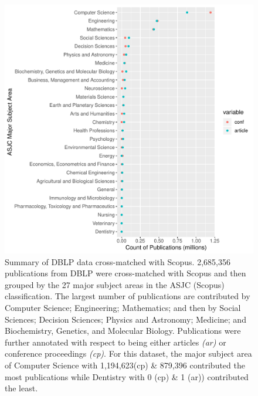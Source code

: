 \begin{figure}[ht]
  \includegraphics[scale=0.6]{ar_cp_ratio.pdf}
\caption{Summary of DBLP data cross-matched with Scopus. 2,685,356 publications from DBLP were cross-matched with Scopus and then grouped by the 27 major subject areas in the ASJC (Scopus) classification. The largest number of publications are contributed by Computer Science; Engineering; Mathematics; and then by Social Sciences; Decision Sciences; Physics and Astronomy; Medicine; and Biochemistry, Genetics, and Molecular Biology. Publications were further annotated with respect to being either articles \emph{(ar)} or conference proceedings \emph{(cp)}. For this dataset, the major subject area of Computer Science with 1,194,623(cp) \& 879,396 contributed the most publications while Dentistry with 0 (cp) \& 1 (ar)) contributed the least.}
\label{fig:ar_cp_annotation}       %
\end{figure}

\newpage

